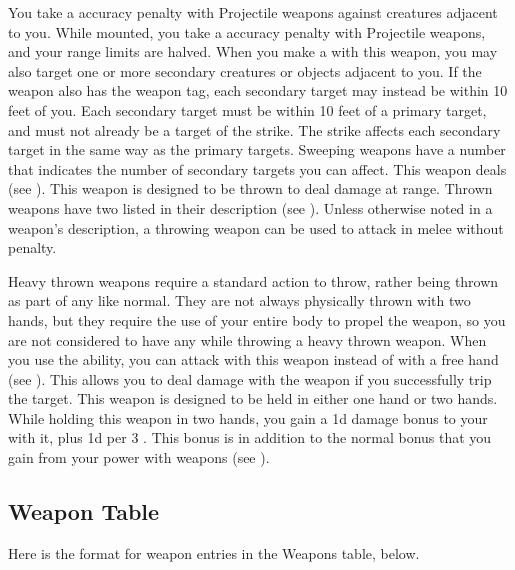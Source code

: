        You take a  accuracy penalty with Projectile weapons against creatures adjacent to you.
        While mounted, you take a  accuracy penalty with Projectile weapons, and your range limits are halved.
        \label{Sweeping} When you make a   with this weapon, you may also target one or more secondary creatures or objects adjacent to you.
        If the weapon also has the  weapon tag, each secondary target may instead be within 10 feet of you.
        Each secondary target must be within 10 feet of a primary target, and must not already be a target of the strike.
        The strike affects each secondary target in the same way as the primary targets.
        Sweeping weapons have a number that indicates the number of secondary targets you can affect.
         This weapon deals  (see ).
         This weapon is designed to be thrown to deal damage at range.
        Thrown weapons have two  listed in their description (see ).
        Unless otherwise noted in a weapon's description, a throwing weapon can be used to attack in melee without penalty.

        Heavy thrown weapons require a standard action to throw, rather being thrown as part of any  like normal.
        They are not always physically thrown with two hands, but they require the use of your entire body to propel the weapon, so you are not considered to have any  while throwing a heavy thrown weapon.
         When you use the  ability, you can attack with this weapon instead of with a free hand (see ).
        This allows you to deal damage with the weapon if you successfully trip the target.
         This weapon is designed to be held in either one hand or two hands.
        While holding this weapon in two hands, you gain a \plus1d damage bonus to your  with it, plus \plus1d per 3 .
        This bonus is in addition to the normal bonus that you gain from your power with weapons (see ).

    \subsection{Weapon Table}
        Here is the format for weapon entries in the Weapons table, below.


